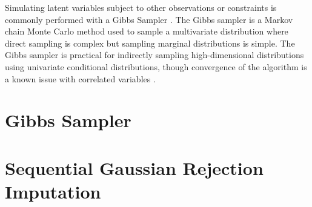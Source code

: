 Simulating latent variables subject to other observations or constraints is commonly performed with a Gibbs Sampler \citep{barnett2015multivariate,emery2014simulating,silva2017multiple,arroyo2020iterative}. The Gibbs sampler is a Markov chain Monte Carlo method used to sample a multivariate distribution where direct sampling is complex but sampling marginal distributions is simple. The Gibbs sampler is practical for indirectly sampling high-dimensional distributions using univariate conditional distributions, though convergence of the algorithm is a known issue with correlated variables \citep{silva2018enhanced}.

\section{Gibbs Sampler}
\label{sec:gibbs}

\section{Sequential Gaussian Rejection Imputation}
\label{sec:sgri}